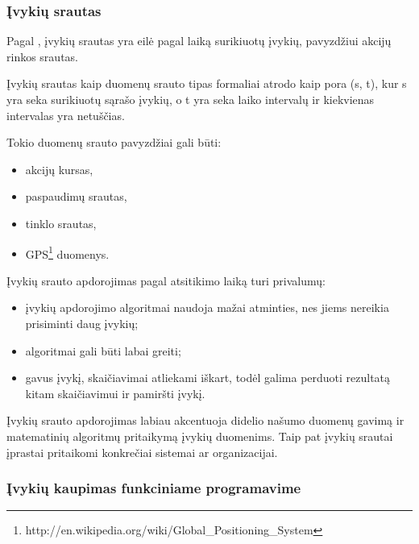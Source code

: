 \subsubsection{Įvykių srautas}

Pagal \cite{Bass:2007:Mythbusters}, įvykių srautas yra eilė pagal laiką surikiuotų įvykių, pavyzdžiui akcijų rinkos srautas.

Įvykių srautas kaip duomenų srauto tipas formaliai atrodo kaip pora (s, t), kur s yra seka surikiuotų sąrašo įvykių, o t yra seka laiko intervalų ir kiekvienas intervalas yra netuščias.

Tokio duomenų srauto pavyzdžiai gali būti:

\begin{itemize}

	\item akcijų kursas,

	\item paspaudimų srautas,

	\item tinklo srautas,

	\item GPS\footnote{http://en.wikipedia.org/wiki/Global\_Positioning\_System} duomenys.

\end{itemize}

Įvykių srauto apdorojimas pagal atsitikimo laiką turi privalumų:

\begin{itemize}

	\item įvykių apdorojimo algoritmai naudoja mažai atminties, nes jiems nereikia prisiminti daug įvykių;

	\item algoritmai gali būti labai greiti;

	\item gavus įvykį, skaičiavimai atliekami iškart, todėl galima perduoti rezultatą kitam skaičiavimui ir pamiršti įvykį.

\end{itemize}

Įvykių srauto apdorojimas labiau akcentuoja didelio našumo duomenų gavimą ir matematinių algoritmų pritaikymą įvykių duomenims. Taip pat įvykių srautai įprastai pritaikomi konkrečiai sistemai ar organizacijai.

\subsubsection{Įvykių kaupimas funkciniame programavime}

